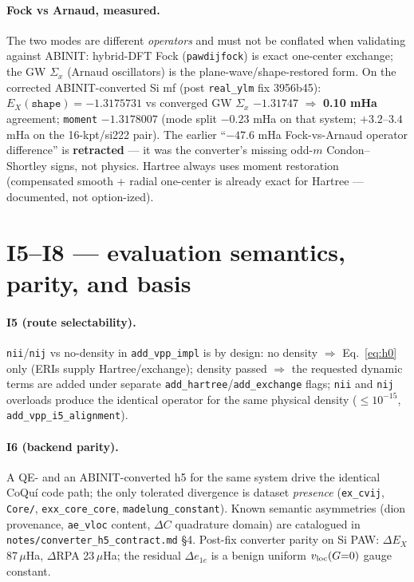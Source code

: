 \documentclass[11pt]{article}
\newcommand{\code}[1]{\texttt{#1}}
\newcommand{\file}[1]{\texttt{#1}}
\begin{document}
\paragraph{Fock vs Arnaud, measured.} The two modes are different
\emph{operators} and must not be conflated when validating against ABINIT:
hybrid-DFT Fock (\code{pawdijfock}) is exact one-center exchange; the GW
$\Sigma_x$ (Arnaud oscillators) is the plane-wave/shape-restored form. On
the corrected ABINIT-converted Si mf (post \code{real\_ylm} fix 3956b45):
$E_X(\code{shape}) = -1.3175731$ vs converged GW $\Sigma_x$ $-1.31747$
$\Rightarrow$ \textbf{0.10 mHa} agreement; \code{moment} $-1.3178007$
(mode split $-0.23$ mHa on that system; $+3.2$--$3.4$ mHa on the
16-kpt/si222 pair). The earlier ``$-47.6$ mHa Fock-vs-Arnaud operator
difference'' is \textbf{retracted} --- it was the converter's missing
odd-$m$ Condon--Shortley signs, not physics. Hartree always uses moment
restoration (compensated smooth + radial one-center is already exact for
Hartree --- documented, not option-ized).

\section{I5--I8 --- evaluation semantics, parity, and basis}
\label{sec:i5678}

\paragraph{I5 (route selectability).} \code{nii}/\code{nij} vs no-density
in \code{add\_vpp\_impl} is by design: no density $\Rightarrow$
Eq.~\eqref{eq:h0} only (ERIs supply Hartree/exchange); density passed
$\Rightarrow$ the requested dynamic terms are added under separate
\code{add\_hartree}/\code{add\_exchange} flags; \code{nii} and \code{nij}
overloads produce the identical operator for the same physical density
($\le 10^{-15}$, \code{add\_vpp\_i5\_alignment}).

\paragraph{I6 (backend parity).} A QE- and an ABINIT-converted h5 for the
same system drive the identical CoQu\'i code path; the only tolerated
divergence is dataset \emph{presence} (\code{ex\_cvij}, \code{Core/},
\code{exx\_core\_core}, \code{madelung\_constant}). Known semantic
asymmetries (dion provenance, \code{ae\_vloc} content, $\Delta C$
quadrature domain) are catalogued in
\file{notes/converter\_h5\_contract.md} \S4. Post-fix converter parity on
Si PAW: $\Delta E_X$ 87\,$\mu$Ha, $\Delta$RPA 23\,$\mu$Ha; the residual
$\Delta e_{1e}$ is a benign uniform $v_{\rm loc}(G{=}0)$ gauge constant.
\end{document}

